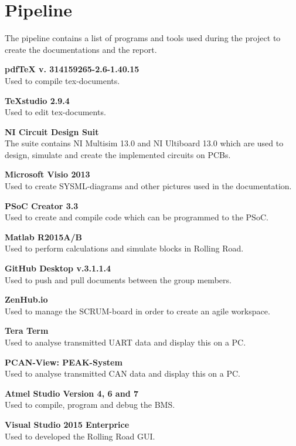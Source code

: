 \chapter{Pipeline}
The pipeline contains a list of programs and tools used during the project to create the documentations and the report.

\textbf{pdfTeX v. 314159265-2.6-1.40.15}\\
Used to compile tex-documents.

\textbf{TeXstudio 2.9.4}\\
Used to edit tex-documents.

\textbf{NI Circuit Design Suit}\\
The suite contains NI Multisim 13.0 and NI Ultiboard 13.0 which are used to design, simulate and create the implemented circuits on PCBs.

\textbf{Microsoft Visio 2013}\\
Used to create SYSML-diagrams and other pictures used in the documentation.

\textbf{PSoC Creator 3.3}\\
Used to create and compile code which can be programmed to the PSoC.

\textbf{Matlab R2015A/B}\\
Used to perform calculations and simulate blocks in Rolling Road.

\textbf{GitHub Desktop v.3.1.1.4}\\
Used to push and pull documents between the group members.

\textbf{ZenHub.io}\\
Used to manage the SCRUM-board in order to create an agile workspace.

\textbf{Tera Term}\\
Used to analyse transmitted UART data and display this on a PC.

\textbf{PCAN-View: PEAK-System}\\
Used to analyse transmitted CAN data and display this on a PC.

\textbf{Atmel Studio Version 4, 6 and 7}\\ 
Used to compile, program and debug the BMS.

\textbf{Visual Studio 2015 Enterprice}\\
Used to developed the Rolling Road GUI.

